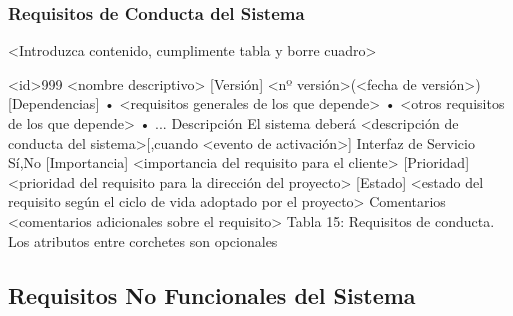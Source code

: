 \subsubsection{Requisitos de Conducta del Sistema}
<Introduzca contenido, cumplimente tabla y borre cuadro>
 

<id>999	<nombre descriptivo>
[Versión]	<nº versión>(<fecha de versión>)
[Dependencias]	•	<requisitos generales de los que depende>
•	<otros requisitos de los que depende>
•	...
Descripción	El sistema deberá <descripción de conducta del sistema>[,cuando <evento de activación>]
Interfaz de Servicio	{Sí,No}
[Importancia]	<importancia del requisito para el cliente>
[Prioridad]	<prioridad del requisito para la dirección del proyecto>
[Estado]	<estado del requisito según el ciclo de vida adoptado por el proyecto>
Comentarios	<comentarios adicionales sobre el requisito>
Tabla 15: Requisitos de conducta.
Los atributos entre corchetes son opcionales

\subsection{Requisitos No Funcionales del Sistema}





